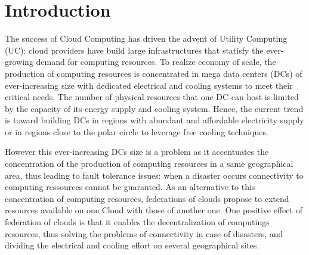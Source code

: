 \section{Introduction}
\label{sec:intro} 

The success of Cloud Computing has driven the advent of Utility Computing (UC): 
cloud providers have build large infrastructures that statisfy the ever-growing 
demand for computing resources. To realize economy of scale, the production
of computing resources is concentrated in mega data centers (DCs) of 
ever-increasing size with dedicated electrical and cooling systems to meet their
critical needs. The number of physical resources that one DC can host is limited
by the capacity of its energy supply and cooling system. Hence, the current 
trend is toward building DCs in regions with abundant and affordable electricity
supply or in regions close to the polar circle to leverage free cooling 
techniques. 

However this ever-increasing DCs size is a problem as it accentuates the 
concentration of the production of computing resources in a same geographical
area, thus leading to fault tolerance issues: when a disaster occurs 
connectivity to computing ressources cannot be guaranted. As an alternative to 
this concentration of computing resources, federations of clouds propose to 
extend resources available on one Cloud with those of another one. One positive 
effect of federation of clouds is that it enables the decentralization of 
computings resources, thus solving the problems of connectivity in case of 
disasters, and dividing the electrical and cooling effort on several 
geographical sites.

